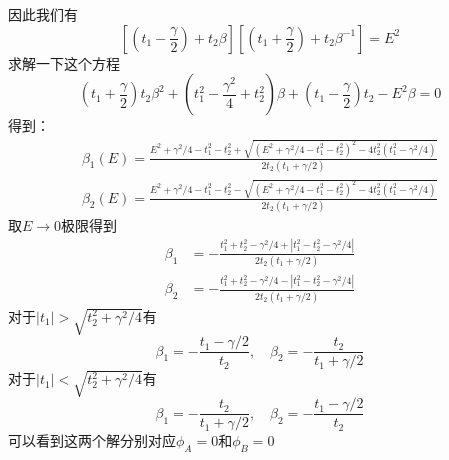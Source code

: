 \documentclass{article}
\begin{document}
因此我们有
\begin{equation}
    \left[\left(t_1-\frac{\gamma}{2}\right)+t_2\beta\right]\left[\left(t_1+\frac{\gamma}{2}\right)+t_2\beta^{-1}\right]=E^2
\end{equation}
求解一下这个方程
\begin{equation}\label{beta-eq}
    (t_1+\frac{\gamma}{2})t_2\beta^2+(t_1^2-\frac{\gamma^2}{4}+t_2^2)\beta+(t_1-\frac{\gamma}{2})t_2-E^2\beta=0
\end{equation}
得到：
\begin{equation}
    \begin{split}
        \beta_1(E)=\frac{E^2+\gamma^2/4-t_1^2-t_2^2+\sqrt{(E^2+\gamma^2/4-t_1^2-t_2^2)^2-4t_2^2(t_1^2-\gamma^2/4)}}{2t_2(t_1+\gamma/2)}\\
        \beta_2(E)=\frac{E^2+\gamma^2/4-t_1^2-t_2^2-\sqrt{(E^2+\gamma^2/4-t_1^2-t_2^2)^2-4t_2^2(t_1^2-\gamma^2/4)}}{2t_2(t_1+\gamma/2)}
    \end{split}
\end{equation}
取$E\to 0$极限得到
\begin{equation}
    \begin{split}
        \beta_1&=-\frac{t_1^2+t_2^2-\gamma^2/4+|t_1^2-t_2^2-\gamma^2/4|}{2t_2(t_1+\gamma/2)}\\
        \beta_2&=-\frac{t_1^2+t_2^2-\gamma^2/4-|t_1^2-t_2^2-\gamma^2/4|}{2t_2(t_1+\gamma/2)}
    \end{split}
\end{equation}
对于$|t_1|>\sqrt{t_2^2+\gamma^2/4}$有
\begin{equation}
    \beta_1=-\frac{t_1-\gamma/2}{t_2},\quad \beta_2=-\frac{t_2}{t_1+\gamma/2}
\end{equation}
对于$|t_1|<\sqrt{t_2^2+\gamma^2/4}$有
\begin{equation}
    \beta_1=-\frac{t_2}{t_1+\gamma/2},\quad \beta_2=-\frac{t_1-\gamma/2}{t_2}
\end{equation}
可以看到这两个解分别对应$\phi_A=0$和$\phi_B=0$
\end{document}
